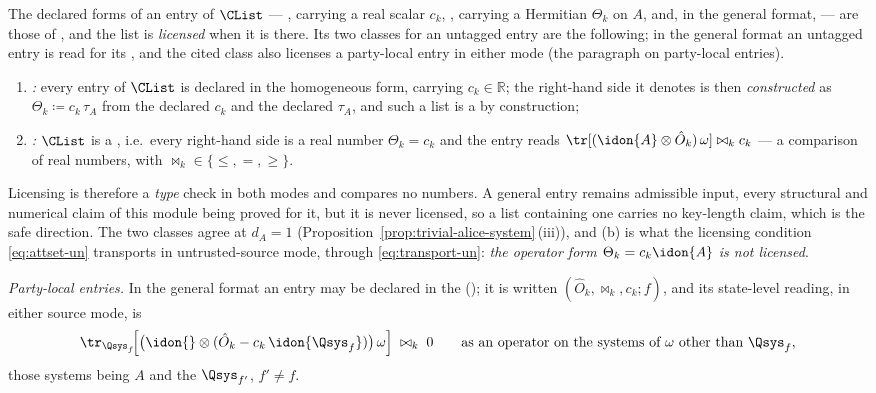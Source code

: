 \begin{definition}\label{def:homog}
The declared forms of an entry of $\CList$ --- , carrying
a real scalar $c_k$, , carrying a Hermitian $\Theta_k$ on $A$,
and, in the general format,  --- are those of
, and the list is \emph{licensed} when it
is  there. Its two classes
for an untagged entry are the following; in the general format an untagged
entry is read for its , and the cited class also
licenses a party-local entry in either mode (the paragraph on party-local
entries).
\begin{enumerate}[label=(\alph*),leftmargin=2.2em]
\item \emph{:} every entry of $\CList$ is declared
in the homogeneous form, carrying $c_k\in\mathbb{R}$; the right-hand side it
denotes is then \emph{constructed} as $\Theta_k\coloneqq c_k\,\tau_A$ from the
declared $c_k$ and the declared $\tau_A$, and such a list is a
by construction;
\item \emph{:} $\CList$ is a
,
i.e.\ every right-hand side is a real number $\Theta_k=c_k$ and the entry
reads $\tr[(\idon{A}\otimes\hat O_k)\,\omega]\bowtie_k c_k$ --- a
comparison of real numbers, with $\bowtie_k\in\{\le,=,\ge\}$.
\end{enumerate}
Licensing is therefore a \emph{type} check in both modes and compares no
numbers. A general entry remains admissible input, every structural and
numerical claim of this module being proved for it, but it is never licensed,
so a list containing one carries no key-length claim, which is the safe
direction. The two classes agree at $d_A=1$
(Proposition~\ref{prop:trivial-alice-system}\,(iii)), and (b) is what the
licensing condition \eqref{eq:attset-un} transports in untrusted-source
mode, through \eqref{eq:transport-un}:
\emph{the operator form $\Theta_k=c_k\idon{A}$ is not licensed}.

\emph{Party-local entries.} In the general format an entry may be declared
in the  (); it is
written $(\hat O_k,\bowtie_k,c_k;f)$, and its state-level reading, in either
source mode, is
\begin{equation}\label{eq:partylocal-entry}
  \tr_{\Qsys_f}\!\Big[\big(\idon{}\otimes
  (\hat O_k-c_k\,\idon{\Qsys_f})\big)\,\omega\Big]\;\bowtie_k\;0
  \qquad\text{as an operator on the systems of }\omega
  \text{ other than }\Qsys_f ,
\end{equation}
those systems being $A$ and the 
$\Qsys_{f'}$, $f'\ne f$.
\end{definition}
